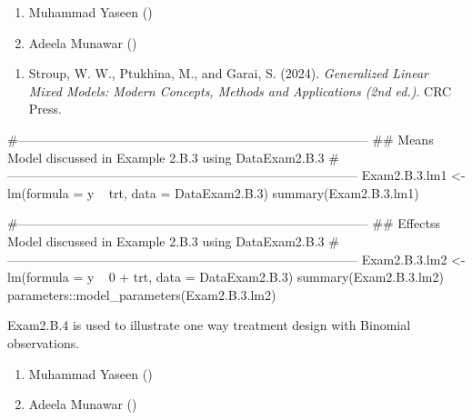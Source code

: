 \documentclass[a4paper]{book}
\begin{document}
%
\begin{Author}
\begin{enumerate}

\item{}  Muhammad Yaseen ()
\item{} Adeela Munawar ()

\end{enumerate}

\end{Author}
%
\begin{References}
\begin{enumerate}

\item{} Stroup, W. W., Ptukhina, M., and Garai, S. (2024).
\emph{Generalized Linear Mixed Models: Modern Concepts, Methods and Applications (2nd ed.)}.
CRC Press.

\end{enumerate}

\end{References}
%
\begin{SeeAlso}
\end{SeeAlso}
%
\begin{Examples}
\begin{ExampleCode}
#-----------------------------------------------------------------------------------
## Means Model  discussed in Example 2.B.3 using DataExam2.B.3
#-----------------------------------------------------------------------------------
Exam2.B.3.lm1 <- lm(formula = y ~ trt, data = DataExam2.B.3)
summary(Exam2.B.3.lm1)

#-----------------------------------------------------------------------------------
## Effectss Model  discussed in Example 2.B.3 using DataExam2.B.3
#-----------------------------------------------------------------------------------
Exam2.B.3.lm2 <- lm(formula = y ~ 0 + trt, data = DataExam2.B.3)
summary(Exam2.B.3.lm2)
parameters::model_parameters(Exam2.B.3.lm2)
\end{ExampleCode}
\end{Examples}
%
\begin{Description}
Exam2.B.4 is used to illustrate one way treatment design with Binomial observations.
\end{Description}
%
\begin{Author}
\begin{enumerate}

\item{}  Muhammad Yaseen ()
\item{} Adeela Munawar ()

\end{enumerate}

\end{Author}
\end{document}
